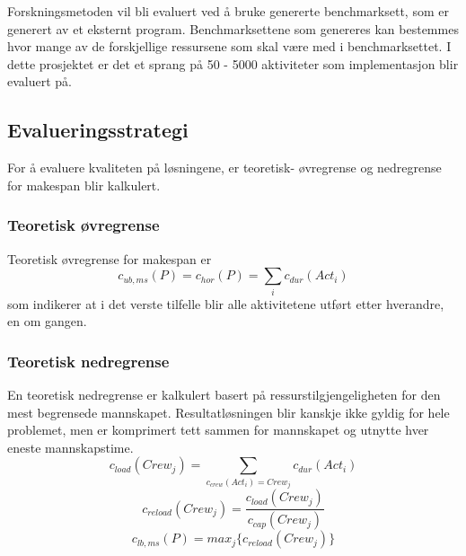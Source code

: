 Forskningsmetoden vil bli evaluert ved å bruke genererte benchmarksett, som er generert av et eksternt program. Benchmarksettene som genereres kan bestemmes hvor mange av de forskjellige ressursene som skal være med i benchmarksettet. I dette prosjektet er det et sprang på 50 - 5000 aktiviteter som implementasjon blir evaluert på.

\subsection{Evalueringsstrategi}
\label{sec:strategy}
For å evaluere kvaliteten på løsningene, er teoretisk- øvregrense og nedregrense for makespan blir kalkulert.

\subsubsection{Teoretisk øvregrense}
\label{sec:teoretiskovre}
Teoretisk øvregrense for makespan er
\begin{equation}
c_{ub,ms}(P) = c_{hor}(P) = \sum_{i} c_{dur}(Act_{i})
\end{equation}
som indikerer at i det verste tilfelle blir alle aktivitetene utført etter hverandre, en om gangen.

\subsubsection{Teoretisk nedregrense}
\label{sec:teoretisknedre}
En teoretisk nedregrense er kalkulert basert på ressurstilgjengeligheten for den mest begrensede mannskapet. Resultatløsningen blir kanskje ikke gyldig for hele problemet, men er komprimert tett sammen for mannskapet og utnytte hver eneste mannskapstime.
\begin{equation}
c_{load}(Crew_{j}) = \sum_{c_{crew}(Act_{i}) = Crew_{j}} c_{dur}(Act_{i})
\end{equation}
\begin{equation}
c_{reload}(Crew_{j}) = \frac{c_{load}(Crew_{j})}{c_{cap}(Crew_{j})}
\end{equation}
\begin{equation}
c_{lb,ms}(P) = max_{j}\{ c_{reload}(Crew_{j}) \}
\end{equation}